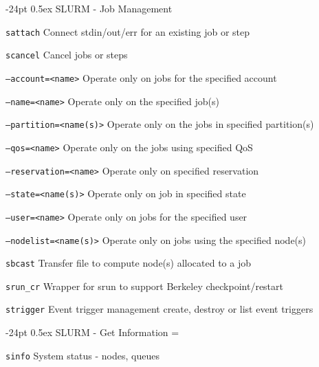 \documentclass[8pt,portrait]{article}
\makeatletter
\renewcommand\section{\@startsection{section}{1}{0mm}%
                                     {-24pt}%
                                     {0.5ex}%
                                {\color{blue}\normalfont\large\bfseries}}
\newcommand{\code}{\texttt}
\newcommand{\describe}[1]{\begin{description}{#1}\end{description}}
\makeatother
\begin{document}
\begin{multicols*}{2}
\section{SLURM - Job Management}

\code{sattach}  Connect stdin/out/err for an existing job or step

\code{scancel}  Cancel jobs or steps 
\describe{
\itemsep=0pt\parskip=0pt
    \item{\code{--account=<name>}} {Operate only on jobs for the specified account}
    \item{\code{--name=<name>}} {Operate only on the specified job(s)} 
    \item{\code{--partition=<name(s)>}} {Operate only on the jobs in specified partition(s)}
    \item{\code{--qos=<name>}} {Operate only on the jobs using specified QoS}
    \item{\code{--reservation=<name>}} {Operate only on specified reservation}
    \item{\code{--state=<name(s)>}} {Operate only on job in specified state}
    \item{\code{--user=<name>}} {Operate only on jobs for the specified user}
    \item{\code{--nodelist=<name(s)>}} {Operate only on jobs using the specified node(s)}
}
    
\code{sbcast}  Transfer file to compute node(s) allocated to a job 

\code{srun\_cr}  Wrapper for srun to support Berkeley checkpoint/restart 

\code{strigger} Event trigger management  create, destroy or list event triggers\\

\columnbreak

\section{SLURM - Get Information}
\everypar={\hangindent=9mm}

\code{sinfo}   System status - nodes, queues


\end{multicols*}
\end{document}
